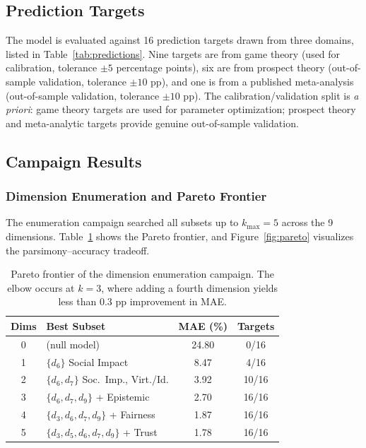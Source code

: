\documentclass[manuscript,review,anonymous]{acmart}
\begin{document}
\subsection{Prediction Targets}

The model is evaluated against 16 prediction targets drawn from three domains, listed in Table~\ref{tab:predictions}.
Nine targets are from game theory (used for calibration, tolerance $\pm 5$ percentage points), six are from prospect theory (out-of-sample validation, tolerance $\pm 10$ pp), and one is from a published meta-analysis (out-of-sample validation, tolerance $\pm 10$ pp).
The calibration/validation split is \emph{a priori}: game theory targets are used for parameter optimization; prospect theory and meta-analytic targets provide genuine out-of-sample validation.

\subsection{Campaign Results}

\subsubsection{Dimension Enumeration and Pareto Frontier}

The enumeration campaign searched all subsets up to $k_{\max} = 5$ across the 9 dimensions.
Table~\ref{tab:pareto} shows the Pareto frontier, and Figure~\ref{fig:pareto} visualizes the parsimony--accuracy tradeoff.

\begin{table}[t]
\centering
\caption{Pareto frontier of the dimension enumeration campaign. The elbow occurs at $k=3$, where adding a fourth dimension yields less than 0.3 pp improvement in MAE.}
\label{tab:pareto}
\small
\begin{tabular}{@{}clcc@{}}
\toprule
\textbf{Dims} & \textbf{Best Subset} & \textbf{MAE (\%)} & \textbf{Targets} \\
\midrule
0 & (null model) & 24.80 & 0/16 \\
1 & $\{d_6\}$ Social Impact & 8.47 & 4/16 \\
2 & $\{d_6, d_7\}$ Soc.\ Imp., Virt./Id. & 3.92 & 10/16 \\
3 & $\{d_6, d_7, d_9\}$ + Epistemic & 2.70 & 16/16 \\
4 & $\{d_3, d_6, d_7, d_9\}$ + Fairness & 1.87 & 16/16 \\
5 & $\{d_3, d_5, d_6, d_7, d_9\}$ + Trust & 1.78 & 16/16 \\
\bottomrule
\end{tabular}
\end{table}
\end{document}
